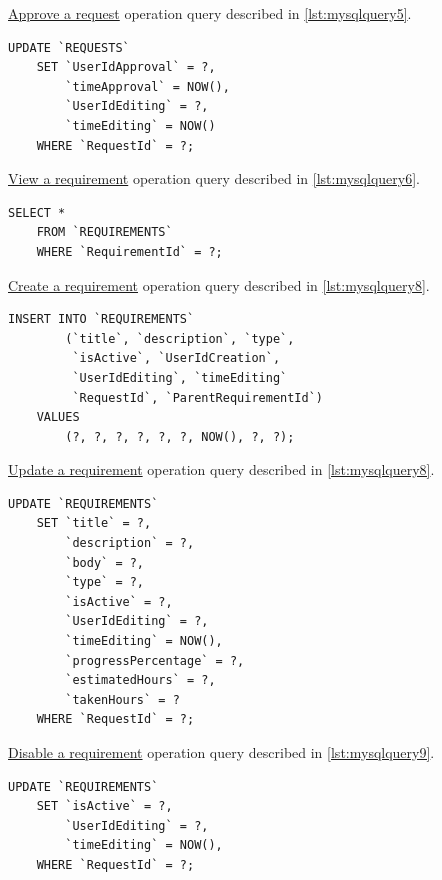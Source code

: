 \documentclass[12pt, a4paper]{report}
\begin{document}
\hyperref[subsubsec:op5]{Approve a request} operation query described in \autoref{lst:mysqlquery5}.

\begin{lstlisting}[language=MySQL, caption={\texorpdfstring{\hyperref[subsubsec:op5]{op. 5}}{op. 5}}, label={lst:mysqlquery5}]
    UPDATE `REQUESTS`
    SET `UserIdApproval` = ?,
        `timeApproval` = NOW(),
        `UserIdEditing` = ?,
        `timeEditing` = NOW()
    WHERE `RequestId` = ?;
\end{lstlisting}

\hyperref[subsubsec:op6]{View a requirement} operation query described in \autoref{lst:mysqlquery6}.

\begin{lstlisting}[language=MySQL, caption={\texorpdfstring{\hyperref[subsubsec:op6]{op. 6}}{op. 6}}, label={lst:mysqlquery6}]
    SELECT *
    FROM `REQUIREMENTS`
    WHERE `RequirementId` = ?;
\end{lstlisting}

\hyperref[subsubsec:op7]{Create a requirement} operation query described in \autoref{lst:mysqlquery8}.

\begin{lstlisting}[language=MySQL, caption={\texorpdfstring{\hyperref[subsubsec:op7]{op. 7}}{op. 7}}, label={lst:mysqlquery7}]
    INSERT INTO `REQUIREMENTS`
        (`title`, `description`, `type`,
         `isActive`, `UserIdCreation`,
         `UserIdEditing`, `timeEditing`
         `RequestId`, `ParentRequirementId`)
    VALUES
        (?, ?, ?, ?, ?, ?, NOW(), ?, ?);
\end{lstlisting}

\hyperref[subsubsec:op8]{Update a requirement} operation query described in \autoref{lst:mysqlquery8}.

\begin{lstlisting}[language=MySQL, caption={\texorpdfstring{\hyperref[subsubsec:op8]{op. 8}}{op. 8}}, label={lst:mysqlquery8}]
    UPDATE `REQUIREMENTS`
    SET `title` = ?,
        `description` = ?,
        `body` = ?,
        `type` = ?,
        `isActive` = ?,
        `UserIdEditing` = ?,
        `timeEditing` = NOW(),
        `progressPercentage` = ?,
        `estimatedHours` = ?,
        `takenHours` = ?
    WHERE `RequestId` = ?;
\end{lstlisting}

\hyperref[subsubsec:op9]{Disable a requirement} operation query described in \autoref{lst:mysqlquery9}.

\begin{lstlisting}[language=MySQL, caption={\texorpdfstring{\hyperref[subsubsec:op9]{op. 9}}{op. 9}}, label={lst:mysqlquery9}]
    UPDATE `REQUIREMENTS`
    SET `isActive` = ?,
        `UserIdEditing` = ?,
        `timeEditing` = NOW(),
    WHERE `RequestId` = ?;
\end{lstlisting}
\end{document}
